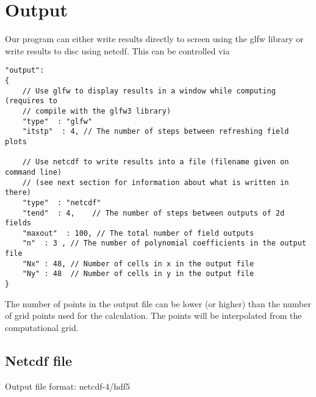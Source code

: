 \section{Output}
Our program can either write results directly to screen using the glfw library
or write results to disc using netcdf.
This can be controlled via
\begin{verbatim}
"output":
{
    // Use glfw to display results in a window while computing (requires to
    // compile with the glfw3 library)
    "type"  : "glfw"
    "itstp"  : 4, // The number of steps between refreshing field plots

    // Use netcdf to write results into a file (filename given on command line)
    // (see next section for information about what is written in there)
    "type"  : "netcdf"
    "tend"  : 4,    // The number of steps between outputs of 2d fields
    "maxout"  : 100, // The total number of field outputs
    "n"  : 3 , // The number of polynomial coefficients in the output file
    "Nx" : 48, // Number of cells in x in the output file
    "Ny" : 48  // Number of cells in y in the output file
}
\end{verbatim}
The number of points in the output file can be lower (or higher) than the number of
grid points used for the calculation. The points will be interpolated from the
computational grid.
\subsection{Netcdf file}
Output file format: netcdf-4/hdf5

